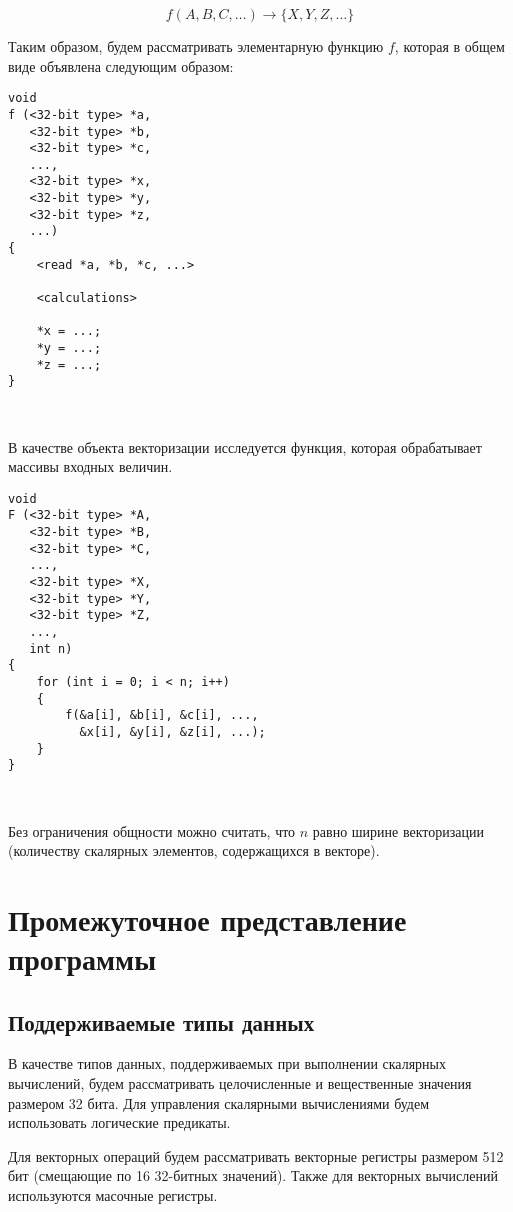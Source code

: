 \documentclass[a4paper,12pt]{extarticle}                     %
\numberwithin{equation}{section}                             %
\numberwithin{figure}{section}                               %
\numberwithin{table}{section}                                %
\theoremstyle{plain}                                         %
\numberwithin{theorem}{section}                              %
\numberwithin{lemma}{section}                                %
\numberwithin{definition}{section}                           %
\begin{document}
\begin{equation}
f(A, B, C, \dots) \rightarrow \{ X, Y, Z, \dots \}
\end{equation}

Таким образом, будем рассматривать элементарную функцию $f$, которая в общем виде объявлена следующим образом:

\begin{lstlisting}[caption={Общий вид скалярной векторизуемой функции.}]
void
f (<32-bit type> *a,
   <32-bit type> *b,
   <32-bit type> *c,
   ...,
   <32-bit type> *x,
   <32-bit type> *y,
   <32-bit type> *z,
   ...)
{
	<read *a, *b, *c, ...>
	
	<calculations>
	
	*x = ...;
	*y = ...;
	*z = ...;    
}
\end{lstlisting}

\

В качестве объекта векторизации исследуется функция, которая обрабатывает массивы входных величин.

\begin{lstlisting}[caption={Общий вид векторизуемой функции, которая содержит вызовы скалярной функции $f$.}]
void
F (<32-bit type> *A,
   <32-bit type> *B,
   <32-bit type> *C,
   ...,
   <32-bit type> *X,
   <32-bit type> *Y,
   <32-bit type> *Z,
   ...,
   int n)
{
	for (int i = 0; i < n; i++)
	{
		f(&a[i], &b[i], &c[i], ...,
		  &x[i], &y[i], &z[i], ...);
	}
}
\end{lstlisting}

\

Без ограничения общности можно считать, что $n$ равно ширине векторизации (количеству скалярных элементов, содержащихся в векторе).

\newpage

\section{Промежуточное представление программы}

\subsection{Поддерживаемые типы данных}

В качестве типов данных, поддерживаемых при выполнении скалярных вычислений, будем рассматривать целочисленные и вещественные значения размером 32 бита. Для управления скалярными вычислениями будем использовать логические предикаты.

Для векторных операций будем рассматривать векторные регистры размером 512 бит (смещающие по 16 32-битных значений). Также для векторных вычислений используются масочные регистры.
\end{document}
